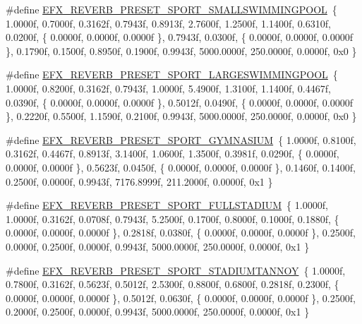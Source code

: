 \begin{DoxyCompactItemize}
\item 
\#define \hyperlink{efx-presets_8h_a3868b5003b7826a394a567e55dbf6c3d}{E\+F\+X\+\_\+\+R\+E\+V\+E\+R\+B\+\_\+\+P\+R\+E\+S\+E\+T\+\_\+\+S\+P\+O\+R\+T\+\_\+\+S\+M\+A\+L\+L\+S\+W\+I\+M\+M\+I\+N\+G\+P\+O\+OL}~\{ 1.\+0000f, 0.\+7000f, 0.\+3162f, 0.\+7943f, 0.\+8913f, 2.\+7600f, 1.\+2500f, 1.\+1400f, 0.\+6310f, 0.\+0200f, \{ 0.\+0000f, 0.\+0000f, 0.\+0000f \}, 0.\+7943f, 0.\+0300f, \{ 0.\+0000f, 0.\+0000f, 0.\+0000f \}, 0.\+1790f, 0.\+1500f, 0.\+8950f, 0.\+1900f, 0.\+9943f, 5000.\+0000f, 250.\+0000f, 0.\+0000f, 0x0 \}
\item 
\#define \hyperlink{efx-presets_8h_ab18c0d7695c7cbcb5b240c2564c20edd}{E\+F\+X\+\_\+\+R\+E\+V\+E\+R\+B\+\_\+\+P\+R\+E\+S\+E\+T\+\_\+\+S\+P\+O\+R\+T\+\_\+\+L\+A\+R\+G\+E\+S\+W\+I\+M\+M\+I\+N\+G\+P\+O\+OL}~\{ 1.\+0000f, 0.\+8200f, 0.\+3162f, 0.\+7943f, 1.\+0000f, 5.\+4900f, 1.\+3100f, 1.\+1400f, 0.\+4467f, 0.\+0390f, \{ 0.\+0000f, 0.\+0000f, 0.\+0000f \}, 0.\+5012f, 0.\+0490f, \{ 0.\+0000f, 0.\+0000f, 0.\+0000f \}, 0.\+2220f, 0.\+5500f, 1.\+1590f, 0.\+2100f, 0.\+9943f, 5000.\+0000f, 250.\+0000f, 0.\+0000f, 0x0 \}
\item 
\#define \hyperlink{efx-presets_8h_a769afdf3f0cf5ddf3b44b336c6940950}{E\+F\+X\+\_\+\+R\+E\+V\+E\+R\+B\+\_\+\+P\+R\+E\+S\+E\+T\+\_\+\+S\+P\+O\+R\+T\+\_\+\+G\+Y\+M\+N\+A\+S\+I\+UM}~\{ 1.\+0000f, 0.\+8100f, 0.\+3162f, 0.\+4467f, 0.\+8913f, 3.\+1400f, 1.\+0600f, 1.\+3500f, 0.\+3981f, 0.\+0290f, \{ 0.\+0000f, 0.\+0000f, 0.\+0000f \}, 0.\+5623f, 0.\+0450f, \{ 0.\+0000f, 0.\+0000f, 0.\+0000f \}, 0.\+1460f, 0.\+1400f, 0.\+2500f, 0.\+0000f, 0.\+9943f, 7176.\+8999f, 211.\+2000f, 0.\+0000f, 0x1 \}
\item 
\#define \hyperlink{efx-presets_8h_af8fa941595873499927d9a0c8870a20e}{E\+F\+X\+\_\+\+R\+E\+V\+E\+R\+B\+\_\+\+P\+R\+E\+S\+E\+T\+\_\+\+S\+P\+O\+R\+T\+\_\+\+F\+U\+L\+L\+S\+T\+A\+D\+I\+UM}~\{ 1.\+0000f, 1.\+0000f, 0.\+3162f, 0.\+0708f, 0.\+7943f, 5.\+2500f, 0.\+1700f, 0.\+8000f, 0.\+1000f, 0.\+1880f, \{ 0.\+0000f, 0.\+0000f, 0.\+0000f \}, 0.\+2818f, 0.\+0380f, \{ 0.\+0000f, 0.\+0000f, 0.\+0000f \}, 0.\+2500f, 0.\+0000f, 0.\+2500f, 0.\+0000f, 0.\+9943f, 5000.\+0000f, 250.\+0000f, 0.\+0000f, 0x1 \}
\item 
\#define \hyperlink{efx-presets_8h_afbd61a4687adf060ebc6a26aa6018671}{E\+F\+X\+\_\+\+R\+E\+V\+E\+R\+B\+\_\+\+P\+R\+E\+S\+E\+T\+\_\+\+S\+P\+O\+R\+T\+\_\+\+S\+T\+A\+D\+I\+U\+M\+T\+A\+N\+N\+OY}~\{ 1.\+0000f, 0.\+7800f, 0.\+3162f, 0.\+5623f, 0.\+5012f, 2.\+5300f, 0.\+8800f, 0.\+6800f, 0.\+2818f, 0.\+2300f, \{ 0.\+0000f, 0.\+0000f, 0.\+0000f \}, 0.\+5012f, 0.\+0630f, \{ 0.\+0000f, 0.\+0000f, 0.\+0000f \}, 0.\+2500f, 0.\+2000f, 0.\+2500f, 0.\+0000f, 0.\+9943f, 5000.\+0000f, 250.\+0000f, 0.\+0000f, 0x1 \}

\end{DoxyCompactItemize}
